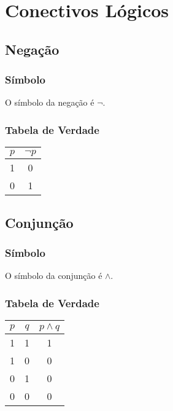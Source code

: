 \section{Conectivos Lógicos}
\label{sec:1-interpretacao-conectivos}

\subsection{Negação}

\subsubsection{Símbolo}
O símbolo da negação é $\neg$.

\subsubsection{Tabela de Verdade}
\begin{table}[H]
    \begin{tabular}{|c|c|}
        \hline
        $p$ & $\neg p$ \\
        \hline
        1 & 0 \\
        0 & 1 \\
        \hline
    \end{tabular}
\end{table}

\subsection{Conjunção}

\subsubsection{Símbolo}
O símbolo da conjunção é $\land$.

\subsubsection{Tabela de Verdade}
\begin{table}[H]
    \begin{tabular}{|c|c|c|}
        \hline
        $p$ & $q$ & $p \land q$ \\
        \hline
        1 & 1 & 1 \\
        1 & 0 & 0 \\
        0 & 1 & 0 \\
        0 & 0 & 0 \\
        \hline
    \end{tabular}
\end{table}

